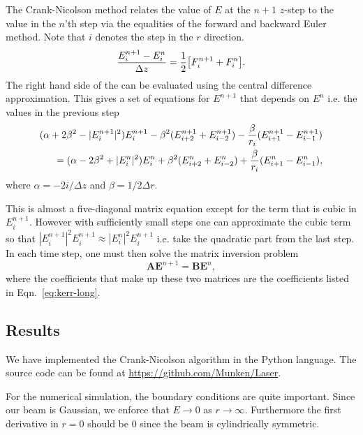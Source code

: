 The Crank-Nicolson method relates the value of $E$ at the $n+1$ $z$-step to the value in the
$n$'th step via the equalities of the forward and backward Euler method. Note that $i$ denotes the
step in the $r$ direction.
\begin{equation}
  \label{eq:Crank-Nicolson-discrete}
  \frac{E^{n+1}_{i} - E^{n}_{i}}{\Delta z} = \frac{1}{2} \big[F_{i}^{n+1}+F_{i}^{n} \big].
\end{equation}
The right hand side of the can be evaluated using the central difference approximation. This gives
a set of equations for $E^{n+1}$ that depends on $E^{n}$ i.e. the values in the previous step
\begin{align}
  \notag
  (\alpha + 2\beta^{2} - |E_{i}^{n+1}|^{2})E_{i}^{n+1} - \beta^{2}(E_{i+2}^{n+1} + E_{i-2}^{n+1}) -
  \frac{\beta}{r_{i}} (E_{i+1}^{n+1} - E_{i-1}^{n+1}) \\
  = (\alpha - 2\beta^{2} + |E_{i}^{n}|^{2})E_{i}^{n} + \beta^{2}(E_{i+2}^{n} + E_{i-2}^{n}) +
  \frac{\beta}{r_{i}} (E_{i+1}^{n} - E_{i-1}^{n}), 
  \label{eq:kerr-long}
\end{align}
where $\alpha = -2i/\!{\Delta z}$ and $\beta = 1/{2 \Delta r}$.

This is almost a five-diagonal matrix equation except for the term that is cubic in
$E_{i}^{n+1}$. However with sufficiently small steps one can approximate the cubic term so that
$|E_{i}^{n+1}|^{2}E_{i}^{n+1} \approx |E_{i}^{n}|^{2}E_{i}^{n+1}$ i.e. take the quadratic part from
the last step. In each time step, one must then solve the matrix inversion problem
\begin{equation}
  \label{eq:matrix}
  \mathbf{A} \mathbf{E}^{n+1} = \mathbf{B} \mathbf{E}^{n}, 
\end{equation}
where the coefficients that make up these two matrices are the coefficients listed in
Eqn.~\eqref{eq:kerr-long}. 

\subsection{Results}
\label{sec:kerr-results}

We have implemented the Crank-Nicolson algorithm in the Python language. The source code can be found at
\url{https://github.com/Munken/Laser}.

For the numerical simulation, the boundary conditions are quite important. Since our beam is Gaussian,
we enforce that $E \rightarrow 0$ as $r \rightarrow \infty$.
Furthermore the first derivative in $r = 0$ should be 0 since the beam is cylindrically symmetric.

